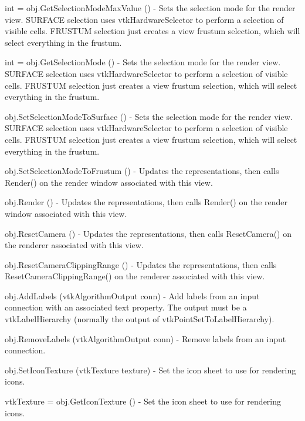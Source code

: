 \begin{DoxyItemize}
\item {\ttfamily int = obj.\-Get\-Selection\-Mode\-Max\-Value ()} -\/ Sets the selection mode for the render view. S\-U\-R\-F\-A\-C\-E selection uses vtk\-Hardware\-Selector to perform a selection of visible cells. F\-R\-U\-S\-T\-U\-M selection just creates a view frustum selection, which will select everything in the frustum.  
\item {\ttfamily int = obj.\-Get\-Selection\-Mode ()} -\/ Sets the selection mode for the render view. S\-U\-R\-F\-A\-C\-E selection uses vtk\-Hardware\-Selector to perform a selection of visible cells. F\-R\-U\-S\-T\-U\-M selection just creates a view frustum selection, which will select everything in the frustum.  
\item {\ttfamily obj.\-Set\-Selection\-Mode\-To\-Surface ()} -\/ Sets the selection mode for the render view. S\-U\-R\-F\-A\-C\-E selection uses vtk\-Hardware\-Selector to perform a selection of visible cells. F\-R\-U\-S\-T\-U\-M selection just creates a view frustum selection, which will select everything in the frustum.  
\item {\ttfamily obj.\-Set\-Selection\-Mode\-To\-Frustum ()} -\/ Updates the representations, then calls Render() on the render window associated with this view.  
\item {\ttfamily obj.\-Render ()} -\/ Updates the representations, then calls Render() on the render window associated with this view.  
\item {\ttfamily obj.\-Reset\-Camera ()} -\/ Updates the representations, then calls Reset\-Camera() on the renderer associated with this view.  
\item {\ttfamily obj.\-Reset\-Camera\-Clipping\-Range ()} -\/ Updates the representations, then calls Reset\-Camera\-Clipping\-Range() on the renderer associated with this view.  
\item {\ttfamily obj.\-Add\-Labels (vtk\-Algorithm\-Output conn)} -\/ Add labels from an input connection with an associated text property. The output must be a vtk\-Label\-Hierarchy (normally the output of vtk\-Point\-Set\-To\-Label\-Hierarchy).  
\item {\ttfamily obj.\-Remove\-Labels (vtk\-Algorithm\-Output conn)} -\/ Remove labels from an input connection.  
\item {\ttfamily obj.\-Set\-Icon\-Texture (vtk\-Texture texture)} -\/ Set the icon sheet to use for rendering icons.  
\item {\ttfamily vtk\-Texture = obj.\-Get\-Icon\-Texture ()} -\/ Set the icon sheet to use for rendering icons.  

\end{DoxyItemize}
